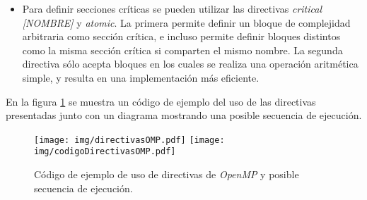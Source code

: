 \begin{itemize}
	\item	Para definir secciones críticas se pueden utilizar las directivas
		\emph{critical [NOMBRE]} y \emph{atomic}. La primera permite
		definir un bloque de complejidad arbitraria como sección
		crítica, e incluso permite definir bloques distintos como la
		misma sección crítica si comparten el mismo nombre. La segunda
		directiva sólo acepta bloques en los cuales se realiza una
		operación aritmética simple, y resulta en una implementación
		más eficiente.

\end{itemize}

En la figura \ref{directivas} se muestra un código de ejemplo del uso de las
directivas presentadas junto con un diagrama mostrando una posible secuencia
de ejecución.

\begin{figure}[!htb]

	\centering

	\texttt{[image: img/directivasOMP.pdf]}
	\texttt{[image: img/codigoDirectivasOMP.pdf]}

	\caption{Código de ejemplo de uso de directivas de \emph{OpenMP} y
	posible secuencia de ejecución.}

	\label{directivas}

\end{figure}
